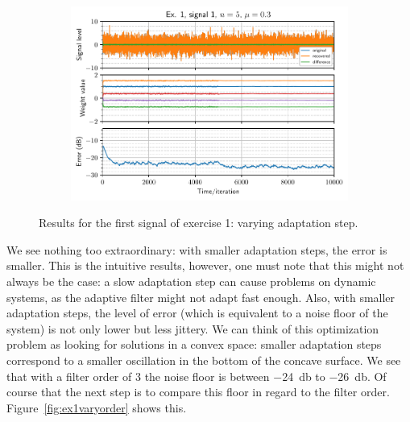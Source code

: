 \begin{figure}[h]
\begin{subfigure}[t]{0.30\columnwidth}
        \caption{}
    \end{subfigure} \hfill
    \begin{subfigure}[t]{0.30\columnwidth}
        \centering
        \includegraphics[width=\columnwidth]{figures/pdf/ex1_l1_n5_mu30.pdf}
        \caption{}
    \end{subfigure}
    \caption{Results for the first signal of exercise 1: varying adaptation
        step.\label{fig:ex1varystep}}
\end{figure}
We see nothing too extraordinary: with smaller adaptation steps, the error is
smaller. This is the intuitive results, however, one must note that this might not
always be the case: a slow adaptation step can cause problems on dynamic systems,
as the adaptive filter might not adapt fast enough. Also, with smaller adaptation
steps, the level of error (which is equivalent to a noise floor of the system) is
not only lower but less jittery. We can think of this optimization problem as
looking for solutions in a convex space: smaller adaptation steps correspond to a
smaller oscillation in the bottom of the concave surface. We see that with a
filter order of 3 the noise floor is between \SI{-24}{\decibel} to
\SI{-26}{\decibel}. Of course that the next step is to compare this floor in
regard to the filter order. Figure~\ref{fig:ex1varyorder} shows this.
